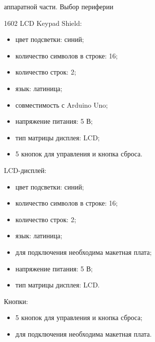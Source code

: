 \documentclass[12pt,a4paper,mathserif]{beamer}
\begin{document}
\begin{frame}{ аппаратной части. Выбор периферии}
    \scriptsize
    \begin{minipage}{0.5\linewidth}
    1602 LCD Keypad Shield:
    \begin{itemize}
        \item цвет подсветки: синий;
        \item количество символов в строке: 16;
        \item количество строк: 2;
        \item язык: латиница;
        \item совместимость с Arduino Uno;
        \item напряжение питания: 5 В;
        \item тип матрицы дисплея: LCD;
        \item 5 кнопок для управления и кнопка сброса.
    \end{itemize}
    \end{minipage}
    \hfill
    \begin{minipage}{0.5\linewidth}
    LCD-дисплей:
    \begin{itemize}
        \item цвет подсветки: синий;
        \item количество символов в строке: 16;
        \item количество строк: 2;
        \item язык: латиница;
        \item для подключения необходима макетная плата;
        \item напряжение питания: 5 В;
        \item тип матрицы дисплея: LCD.
    \end{itemize}
    Кнопки:
    \begin{itemize}
        \item 5 кнопок для управления и кнопка сброса;
        \item для подключения необходима макетная плата.
    \end{itemize}
    \end{minipage}
\end{frame}
\end{document}

